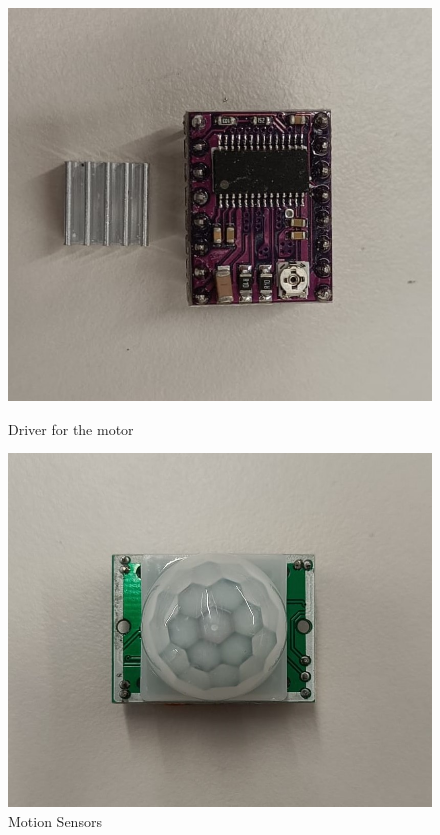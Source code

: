 \documentclass{article}
\begin{document}
\begin{figure}[H]
  \centering
  \begin{minipage}[b]{0.4\textwidth}
    \includegraphics[width=\textwidth]{driver.jpg}
    \caption{Driver for the motor}
  \end{minipage}
  \hfill
  \begin{minipage}[b]{0.4\textwidth}
    \includegraphics[width=\textwidth]{sensor.jpg}
    \caption{Motion Sensors}
  \end{minipage}
\end{figure}
\end{document}
